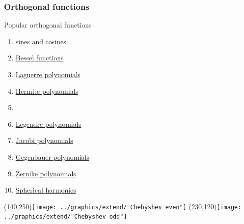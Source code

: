 \documentclass[handout]{beamer}
\begin{document}
\begin{frame}      %
\frametitle{Orthogonal functions}
  Popular orthogonal functions
  \begin{enumerate}
    \item sines and cosines
    \item \href{http://mathworld.wolfram.com/BesselFunction.html}{Bessel functions}
    \item \href{http://mathworld.wolfram.com/LaguerrePolynomial.html}{Laguerre polynomials}
    \item \href{http://mathworld.wolfram.com/HermitePolynomial.html}{Hermite polynomials}
    \item \href{http://mathworld.wolfram.com/ChebyshevPolynomialoftheFirstKind.html}{}
    \item \href{http://mathworld.wolfram.com/LegendrePolynomial.html}{Legendre polynomials}
    \item \href{http://mathworld.wolfram.com/JacobiPolynomial.html}{Jacobi polynomials}
    \item \href{http://mathworld.wolfram.com/GegenbauerPolynomial.html}{Gegenbauer polynomials}
    \item \href{http://mathworld.wolfram.com/ZernikePolynomial.html}{Zernike polynomials}
    \item \href{http://mathworld.wolfram.com/SphericalHarmonic.html}{Spherical harmonics}
  \end{enumerate}
    \Put(140,250){\texttt{[image: ../graphics/extend/"Chebyshev even"]}}
    \Put(230,120){\texttt{[image: ../graphics/extend/"Chebyshev odd"]}}
\end{frame}
\end{document}
